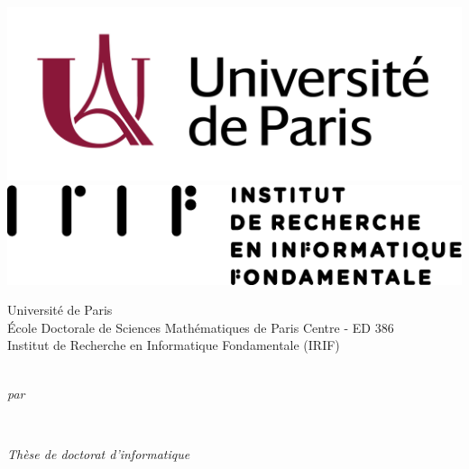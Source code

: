 
\begin{titlepage}
  \makeatletter
  \begin{center}
    \includegraphics[scale=.4]{assets/uparis_couleur_RVB.png} \hfill \includegraphics[scale=.4]{assets/IRIF_horizontal_version.png}\\
    \vspace{1em}
    \begin{large}
    Université de Paris\\
    École Doctorale de Sciences Mathématiques de Paris Centre - ED 386\\
    Institut de Recherche en Informatique Fondamentale (IRIF)\\
    \end{large}
    \vspace{0.7cm}
    \begin{Huge}
      \@title
    \end{Huge}\\[0.1cm]
    \emph{par}\\
    \vspace{0.1cm}
    \begin{Large}\@author\end{Large}\\
    \vspace{0.7cm}
    \begin{Large}\emph{Thèse de doctorat d’informatique}\end{Large}\\

\end{center}
\end{titlepage}
